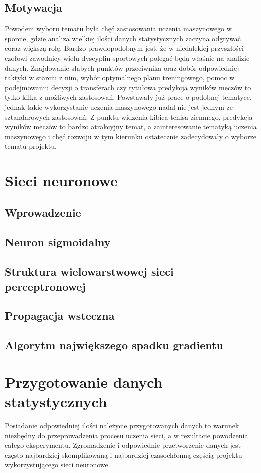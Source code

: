 \section{Motywacja}
Powodem wyboru tematu była chęć zastosowania uczenia maszynowego w sporcie, gdzie analiza wielkiej ilości danych statystycznych zaczyna odgrywać coraz większą rolę. Bardzo prawdopodobnym jest, że w niedalekiej przyszłości czołowi zawodnicy wielu dyscyplin sportowych polegać będą właśnie na analizie danych. Znajdowanie słabych punktów przeciwnika oraz dobór odpowiedniej taktyki w starciu z nim, wybór optymalnego planu treningowego, pomoc w podejmowaniu decyzji o transferach czy tytułowa predykcja wyników meczów to tylko kilka z możliwych zastosowań.  Powstawały już prace o podobnej tematyce, jednak takie wykorzystanie uczenia maszynowego nadal nie jest jednym ze sztandarowych zastosowań. Z punktu widzenia kibica tenisa ziemnego, predykcja wyników meczów to bardzo atrakcyjny temat, a zainteresowanie tematyką uczenia maszynowego i chęć rozwoju w tym kierunku ostatecznie zadecydowały o wyborze tematu projektu.


\chapter{Sieci neuronowe}
\section{Wprowadzenie}
\section{Neuron sigmoidalny}
\section{Struktura wielowarstwowej sieci perceptronowej}
\section{Propagacja wsteczna}
\section{Algorytm największego spadku gradientu}

\chapter{Przygotowanie danych statystycznych}
Posiadanie odpowiedniej ilości należycie przygotowanych danych to warunek niezbędny do przeprowadzenia procesu uczenia sieci, a w rezultacie powodzenia całego eksperymentu. Zgromadzenie i odpowiednie przetworzenie danych jest często najbardziej skomplikowaną i najbardziej czasochłonną częścią projektu wykorzystującego sieci neuronowe. 


